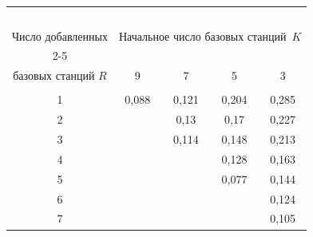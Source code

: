  \begin{table}\small

 \begin{center}



\parbox{265pt}{



}

 \vspace*{2ex}



 \begin{tabular}{|c|c|c|c|c|}

 \hline

&\multicolumn{4}{c|}{\ }\\[-9pt]

Число добавленных

&\multicolumn{4}{c|}{Начальное число базовых станций~$K$}\\

\cline{2-5}

&&&&\\[-9pt]

базовых станций $R$

&9&7&5&3\\

\hline

&&&&\\[-10pt]

1&0,088&0,121&0,204&0,285\\

2& &0,13\hphantom{9}&0,17\hphantom{9}&0,227\\

3& &0,114&0,148&0,213\\

4& & &0,128&0,163\\

5& & &0,077&0,144\\

6& & & &0,124\\

7& & & &0,105\\

\hline

\end{tabular}

\end{center}

\end{table}



